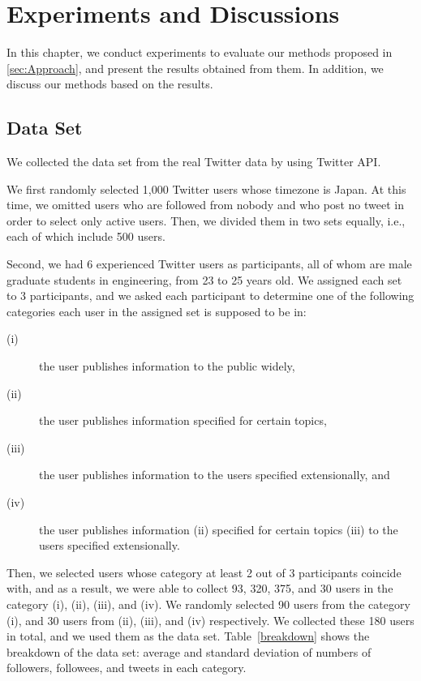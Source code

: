 \section{Experiments and Discussions}
\label{sec:Experiment}

In this chapter, we conduct experiments to evaluate our methods proposed
in \ref{sec:Approach}, and present the results obtained from them.  In
addition, we discuss our methods based on the results.

\subsection{Data Set}
\label{subsec:Data Set}

We collected the data set from the real Twitter data by using Twitter
API.

We first randomly selected 1,000 Twitter users whose timezone is Japan.
At this time, we omitted users who are followed from nobody and who post
no tweet in order to select only active users.  Then, we divided them in
two sets equally, i.e., each of which include 500 users.

Second, we had 6 experienced Twitter users as participants, all of whom
are male graduate students in engineering, from 23 to 25 years old.  We
assigned each set to 3 participants, and we asked each participant to
determine one of the following categories each user in the assigned set
is supposed to be in:

\begin{description}
\item[(i)] the user publishes information to the public widely,
\item[(ii)] the user publishes information specified for certain topics,
\item[(iii)] the user publishes information to the users specified
           extensionally, and
\item[(iv)] the user publishes information (ii) specified for certain
           topics (iii) to the users specified extensionally.
\end{description}


Then, we selected users whose category at least 2 out of 3 participants
coincide with, and as a result, we were able to collect 93, 320, 375,
and 30 users in the category (i), (ii), (iii), and (iv).  We randomly
selected 90 users from the category (i), and 30 users from (ii), (iii),
and (iv) respectively.  We collected these 180 users in total, and we
used them as the data set.  Table~\ref{breakdown} shows the breakdown of
the data set: average and standard deviation of numbers of followers,
 followees, and tweets in each category.


